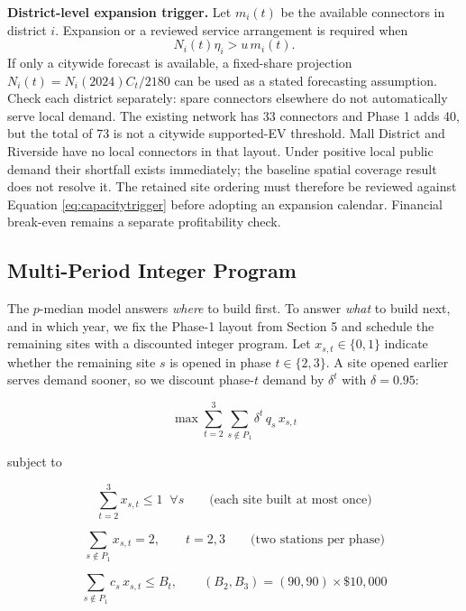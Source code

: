 \documentclass[12pt]{article}
\begin{document}
\textbf{District-level expansion trigger.} Let $m_i(t)$ be the available connectors
in district $i$. Expansion or a reviewed service arrangement is required when
\begin{equation}
N_i(t)\eta_i>u\,m_i(t).
\label{eq:capacitytrigger}
\end{equation}
If only a citywide forecast is available, a fixed-share projection
$N_i(t)=N_i(2024)C_t/2180$ can be used as a stated forecasting assumption. Check each
district separately: spare connectors elsewhere do not automatically serve local demand.
The existing network has 33 connectors and Phase 1 adds 40, but the total of 73 is not a
citywide supported-EV threshold. Mall District and Riverside have no local connectors
in that layout. Under positive local public demand their shortfall exists immediately;
the baseline spatial coverage result does not resolve it. The retained site ordering
must therefore be reviewed against Equation \ref{eq:capacitytrigger} before adopting
an expansion calendar. Financial break-even remains a separate profitability check.

\subsection{Multi-Period Integer Program}

The $p$-median model answers \emph{where} to build first. To answer \emph{what} to build
next, and in which year, we fix the Phase-1 layout from Section 5 and schedule the
remaining sites with a discounted integer program. Let $x_{s,t}\in\{0,1\}$ indicate whether
the remaining site $s$ is opened in phase $t\in\{2,3\}$. A site opened earlier serves
demand sooner, so we discount phase-$t$ demand by $\delta^{t}$ with $\delta=0.95$:

\begin{equation}
\max \sum_{t=2}^{3}\sum_{s\notin P_1} \delta^{t}\, q_s\, x_{s,t}
\end{equation}

subject to

\begin{equation}
\sum_{t=2}^{3} x_{s,t} \le 1 \;\; \forall s \qquad \text{(each site built at most once)}
\end{equation}

\begin{equation}
\sum_{s\notin P_1} x_{s,t} = 2, \qquad t = 2, 3 \qquad \text{(two stations per phase)}
\end{equation}

\begin{equation}
\sum_{s\notin P_1} c_s\, x_{s,t} \le B_t, \qquad (B_2, B_3) = (90, 90) \times \$10{,}000
\end{equation}
\end{document}
